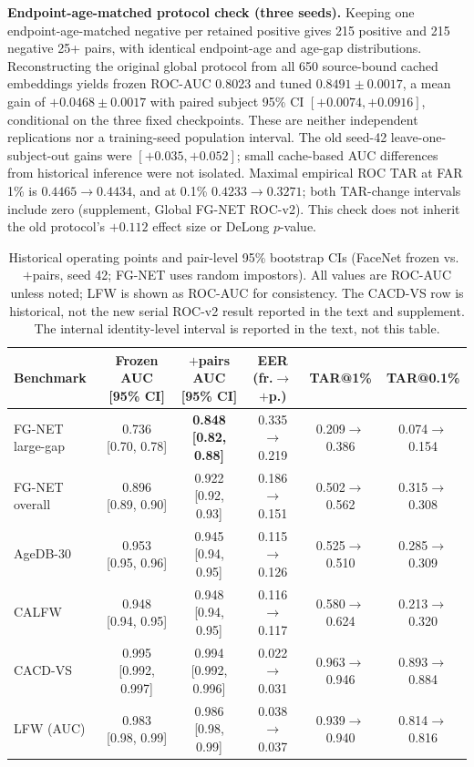 \documentclass[journal]{IEEEtran}
\begin{document}
\noindent\textbf{Endpoint-age-matched protocol check (three seeds).} Keeping one endpoint-age-matched negative per retained positive gives 215 positive and 215 negative 25+ pairs, with identical endpoint-age and age-gap distributions. Reconstructing the original global protocol from all 650 source-bound cached embeddings yields frozen ROC-AUC 0.8023 and tuned $0.8491\pm0.0017$, a mean gain of $+0.0468\pm0.0017$ with paired subject 95\% CI $[+0.0074,+0.0916]$, conditional on the three fixed checkpoints. These are neither independent replications nor a training-seed population interval. The old seed-42 leave-one-subject-out gains were $[+0.035,+0.052]$; small cache-based AUC differences from historical inference were not isolated. Maximal empirical ROC TAR at FAR 1\% is $0.4465\to0.4434$, and at 0.1\% $0.4233\to0.3271$; both TAR-change intervals include zero (supplement, Global FG-NET ROC-v2). This check does not inherit the old protocol's $+0.112$ effect size or DeLong $p$-value.

\begin{table}[!t]
\renewcommand{\arraystretch}{1.2}
\caption{Historical operating points and pair-level 95\% bootstrap CIs (FaceNet frozen vs.\ $+$pairs, seed 42; FG-NET uses random impostors). All values are ROC-AUC unless noted; LFW is shown as ROC-AUC for consistency. The CACD-VS row is historical, not the new serial ROC-v2 result reported in the text and supplement. The internal identity-level interval is reported in the text, not this table.}
\label{tab:stats}
\centering
\footnotesize
\begin{tabular}{@{}lccccc@{}}
\toprule
Benchmark & Frozen AUC [95\% CI] & $+$pairs AUC [95\% CI] & EER (fr.$\to$$+$p.) & TAR@1\% & TAR@0.1\% \\
\midrule
FG-NET large-gap & 0.736 [0.70, 0.78] & \textbf{0.848 [0.82, 0.88]} & 0.335$\to$0.219 & 0.209$\to$0.386 & 0.074$\to$0.154 \\
FG-NET overall & 0.896 [0.89, 0.90] & 0.922 [0.92, 0.93] & 0.186$\to$0.151 & 0.502$\to$0.562 & 0.315$\to$0.308 \\
AgeDB-30 & 0.953 [0.95, 0.96] & 0.945 [0.94, 0.95] & 0.115$\to$0.126 & 0.525$\to$0.510 & 0.285$\to$0.309 \\
CALFW & 0.948 [0.94, 0.95] & 0.948 [0.94, 0.95] & 0.116$\to$0.117 & 0.580$\to$0.624 & 0.213$\to$0.320 \\
CACD-VS & 0.995 [0.992, 0.997] & 0.994 [0.992, 0.996] & 0.022$\to$0.031 & 0.963$\to$0.946 & 0.893$\to$0.884 \\
LFW (AUC) & 0.983 [0.98, 0.99] & 0.986 [0.98, 0.99] & 0.038$\to$0.037 & 0.939$\to$0.940 & 0.814$\to$0.816 \\
\bottomrule
\end{tabular}
\end{table}
\end{document}
